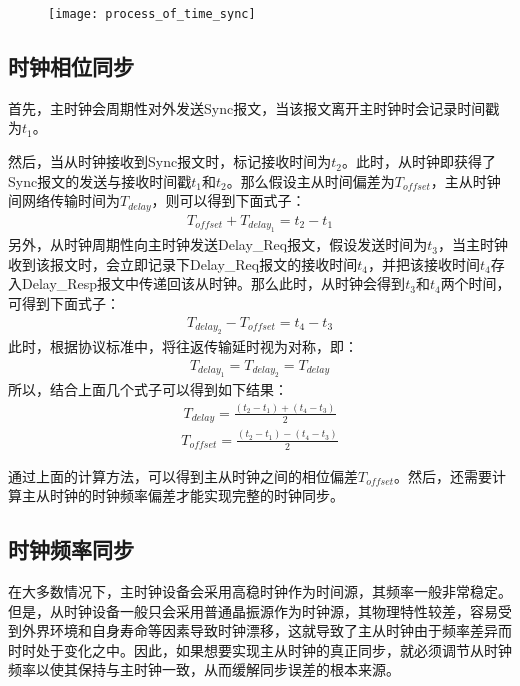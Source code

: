 \begin{figure}[htbp]
  \centering
  \begin{minipage}[b]{0.6\textwidth}
    \captionstyle{\centering}
    \centering
    \texttt{[image: process\_of\_time\_sync]}
  \end{minipage}     
\end{figure}

\subsection{时钟相位同步}
首先，主时钟会周期性对外发送Sync报文，当该报文离开主时钟时会记录时间戳为$t_{1}$。

然后，当从时钟接收到Sync报文时，标记接收时间为$t_{2}$。此时，从时钟即获得了Sync报文的发送与接收时间戳$t_{1}$和$t_{2}$。那么假设主从时间偏差为$T_{offset}$，主从时钟间网络传输时间为$T_{delay}$，则可以得到下面式子：
\begin{align}
	T_{offset} + T_{delay_1} = t_2 - t_1
\end{align}
另外，从时钟周期性向主时钟发送Delay\_Req报文，假设发送时间为$t_{3}$，当主时钟收到该报文时，会立即记录下Delay\_Req报文的接收时间$t_{4}$，并把该接收时间$t_{4}$存入Delay\_Resp报文中传递回该从时钟。那么此时，从时钟会得到$t_{3}$和$t_{4}$两个时间，可得到下面式子：
\begin{align}
	T_{delay_2} - T_{offset} = t_4 - t_3
\end{align}
此时，根据协议标准中，将往返传输延时视为对称，即：
\begin{align}
	T_{delay_1} = T_{delay_2} = T_{delay}
\end{align}
所以，结合上面几个式子可以得到如下结果：
\begin{align}
	T_{delay} = \frac{(t_2 - t_1) + (t_4 - t_3)}{2}
\end{align}
\begin{align}
	T_{offset} = \frac{(t_2 - t_1) - (t_4 - t_3)}{2}
\end{align}

通过上面的计算方法，可以得到主从时钟之间的相位偏差$T_{offset}$。然后，还需要计算主从时钟的时钟频率偏差才能实现完整的时钟同步。

\subsection{时钟频率同步}
在大多数情况下，主时钟设备会采用高稳时钟作为时间源，其频率一般非常稳定。但是，从时钟设备一般只会采用普通晶振源作为时钟源，其物理特性较差，容易受到外界环境和自身寿命等因素导致时钟漂移，这就导致了主从时钟由于频率差异而时时处于变化之中。因此，如果想要实现主从时钟的真正同步，就必须调节从时钟频率以使其保持与主时钟一致，从而缓解同步误差的根本来源。

